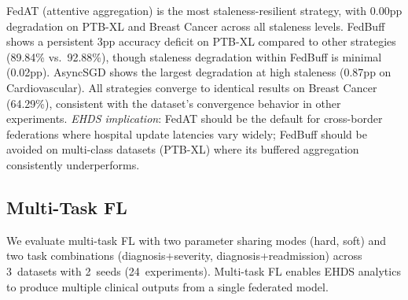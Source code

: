 \documentclass[conference]{IEEEtran}
\begin{document}
\begin{table}[htbp]
\centering
\caption{Asynchronous FL: Accuracy (\%) by Strategy and Staleness}
\label{tab:async_fl}

\vspace{1mm}
\footnotesize{FedAT (attentive aggregation) is the most staleness-resilient strategy, with 0.00pp degradation on PTB-XL and Breast Cancer across all staleness levels. FedBuff shows a persistent 3pp accuracy deficit on PTB-XL compared to other strategies (89.84\% vs.\ 92.88\%), though staleness degradation within FedBuff is minimal (0.02pp). AsyncSGD shows the largest degradation at high staleness (0.87pp on Cardiovascular). All strategies converge to identical results on Breast Cancer (64.29\%), consistent with the dataset's convergence behavior in other experiments. \textit{EHDS implication}: FedAT should be the default for cross-border federations where hospital update latencies vary widely; FedBuff should be avoided on multi-class datasets (PTB-XL) where its buffered aggregation consistently underperforms.}
\end{table}

\subsection{Multi-Task FL}
\label{sec:multitask_fl}

We evaluate multi-task FL with two parameter sharing modes (hard, soft) and two task combinations (diagnosis+severity, diagnosis+readmission) across 3~datasets with 2~seeds (24~experiments). Multi-task FL enables EHDS analytics to produce multiple clinical outputs from a single federated model.
\end{document}
